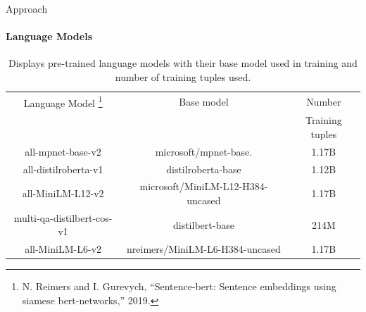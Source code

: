 \documentclass[aspectratio=169]{beamer}
\begin{document}
\begin{frame}{Approach}
\framesubtitle{Language Models}
\begin{table}
	\begin{center}
		\begin{tabular}{ |c|c|c| }
			\hline
			Language Model \footnote{\footnotesize\tiny N. Reimers and I. Gurevych, “Sentence-bert: Sentence embeddings using siamese bert-networks,”
				2019.} & Base model & Number \\&&Training tuples  
			\\ \hline 
			all-mpnet-base-v2  & 	microsoft/mpnet-base. &1.17B
			
			\\ \hline
			all-distilroberta-v1 & 	distilroberta-base &1.12B
			\\ \hline
			all-MiniLM-L12-v2 & 		microsoft/MiniLM-L12-H384-uncased &1.17B
			\\ \hline
			multi-qa-distilbert-cos-v1 & 	distilbert-base &214M
			\\ \hline
			all-MiniLM-L6-v2 & 		nreimers/MiniLM-L6-H384-uncased &1.17B
			\\ \hline
		\end{tabular}
		\caption{Displays pre-trained language models with their base model used in training and number of training tuples used.}
		\label{table:language models}
	\end{center}
\end{table}
\end{frame}
\end{document}
